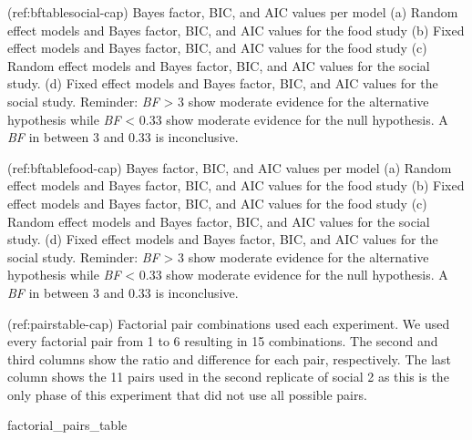 \documentclass[
]{article}
\newenvironment{Shaded}{\begin{snugshade}}{\end{snugshade}}
\newcommand{\NormalTok}[1]{#1}
\begin{document}
\renewcommand{\thetable}{A\arabic{table}}
\setcounter{table}{0}
\renewcommand{\thefigure}{A\arabic{figure}}
\setcounter{figure}{0}

(ref:bftablesocial-cap) Bayes factor, BIC, and AIC values per model (a)
Random effect models and Bayes factor, BIC, and AIC values for the food
study (b) Fixed effect models and Bayes factor, BIC, and AIC values for
the food study (c) Random effect models and Bayes factor, BIC, and AIC
values for the social study. (d) Fixed effect models and Bayes factor,
BIC, and AIC values for the social study. Reminder: \emph{BF}
\textgreater{} 3 show moderate evidence for the alternative hypothesis
while \emph{BF} \textless{} 0.33 show moderate evidence for the null
hypothesis. A \emph{BF} in between 3 and 0.33 is inconclusive.

(ref:bftablefood-cap) Bayes factor, BIC, and AIC values per model (a)
Random effect models and Bayes factor, BIC, and AIC values for the food
study (b) Fixed effect models and Bayes factor, BIC, and AIC values for
the food study (c) Random effect models and Bayes factor, BIC, and AIC
values for the social study. (d) Fixed effect models and Bayes factor,
BIC, and AIC values for the social study. Reminder: \emph{BF}
\textgreater{} 3 show moderate evidence for the alternative hypothesis
while \emph{BF} \textless{} 0.33 show moderate evidence for the null
hypothesis. A \emph{BF} in between 3 and 0.33 is inconclusive.

(ref:pairstable-cap) Factorial pair combinations used each experiment.
We used every factorial pair from 1 to 6 resulting in 15 combinations.
The second and third columns show the ratio and difference for each
pair, respectively. The last column shows the 11 pairs used in the
second replicate of social 2 as this is the only phase of this
experiment that did not use all possible pairs.

\begin{Shaded}
\begin{Highlighting}[]
\NormalTok{factorial\_pairs\_table }
\end{Highlighting}
\end{Shaded}
\end{document}
